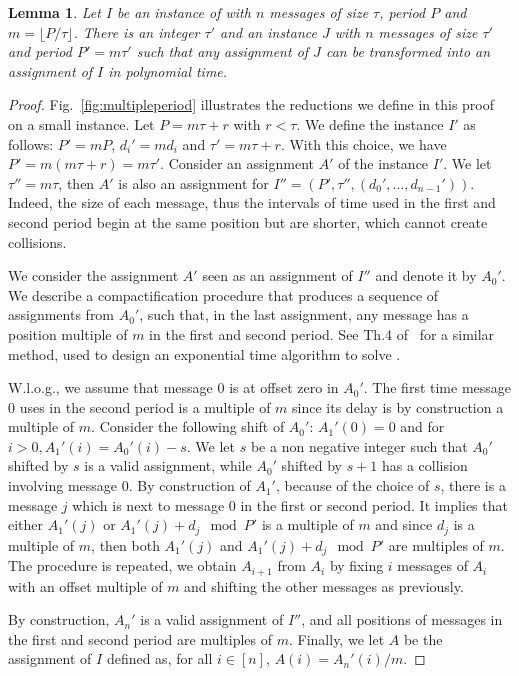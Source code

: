 \documentclass[pdflatex,sn-mathphys,iicol]{sn-jnl}%
\theoremstyle{thmstyleone}%
\newtheorem{lemma}[theorem]{Lemma}
\theoremstyle{thmstyletwo}%
\theoremstyle{thmstylethree}%
\begin{document}
\begin{lemma}\label{lemma:multiple}
Let $I$ be an instance of \pma with $n$ messages of size $\tau$, period $P$ and $m = \lfloor P / \tau \rfloor$. There is an integer $\tau'$ and an instance $J$ with $n$ messages of size $\tau'$ and period $P'= m\tau'$ such that any assignment of $J$ can be transformed into an assignment of $I$ in polynomial time.
\end{lemma}
\begin{proof}
Fig.~\ref{fig:multipleperiod} illustrates the reductions we define in this proof on a small instance.
Let $P = m \tau + r$ with $r < \tau$. We define the instance $I'$ as follows: $P' = mP$, $d_{i}' = m d_i$ and $\tau' = m \tau + r$. With this choice, we have $P' = m(m \tau + r) = m \tau'$.
Consider an assignment $A'$ of the instance $I'$. We let $\tau'' = m\tau$, then $A'$ is also an assignment for $I'' = (P',\tau'',(d_{0}',\dots,d_{n-1}'))$. Indeed, the size of each message, thus the intervals of time used in the first and second period begin at the same position but are shorter, which cannot create collisions. 

We consider the assignment $A'$ seen as an assignment of $I''$ and denote it by $A_0'$.
We describe a compactification procedure that produces a sequence of assignments from $A_0'$, such that, in the last assignment, any message has a position multiple of $m$ in the first and second period. See Th.4 of~\cite{bartharxiv2018deterministic} for a similar method, used to design an exponential time algorithm to solve \pma. 

W.l.o.g., we assume that message $0$ is at offset zero in $A_0'$. The first time message $0$ uses in the second period is a multiple of $m$ since its delay is by construction a multiple of $m$. Consider the following shift of $A_0'$: $A_1'(0) = 0$ and for $i>0, A_1'(i) = A_0'(i) - s$. We let $s$ be a non negative integer such that $A_0'$ shifted by $s$ is a valid assignment, while $A_0'$ shifted by $s+1$ has a collision involving message $0$. By construction of $A_1'$, because of the choice of $s$, there is a message $j$ which is next to message $0$ in the first or second period. It implies that either $A_1'(j)$ or $A_1'(j)+d_j \mod P'$ is a multiple of $m$ and since $d_j$ is a multiple of $m$, then both $A_1'(j)$ and $A_1'(j)+d_j \mod P'$ are multiples of $m$. The procedure is repeated, we obtain $A_{i+1}$ from $A_i$ by fixing $i$ messages of $A_i$ with an offset multiple of $m$ and shifting the other messages as previously. 

By construction, $A_n'$ is a valid assignment of $I''$, and all positions of messages in the first and second period are multiples of $m$. Finally, we let $A$ be the assignment of $I$ defined as, for all $i \in [n]$, $A(i) = A_n'(i)/m$. 
\end{proof}
\end{document}
